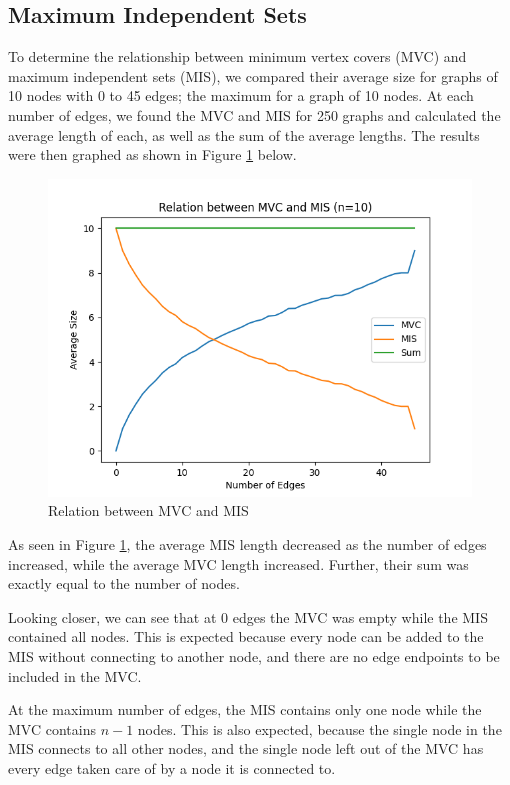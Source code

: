 \documentclass[titlepage]{article}
\begin{document}
\subsection{Maximum Independent Sets}

To determine the relationship between minimum vertex covers (MVC) and maximum independent sets (MIS), we compared their average size for graphs of 10 nodes with 0 to 45 edges; the maximum for a graph of 10 nodes. At each number of edges, we found the MVC and MIS for 250 graphs and calculated the average length of each, as well as the sum of the average lengths. The results were then graphed as shown in Figure \ref{fig:mvc_mis} below.

\begin{figure}[H]
    \centering
    \includegraphics[width=0.8\linewidth]{mvc_mis.png}
    \caption{Relation between MVC and MIS}
    \label{fig:mvc_mis}
\end{figure}

As seen in Figure \ref{fig:mvc_mis}, the average MIS length decreased as the number of edges increased, while the average MVC length increased. Further, their sum was exactly equal to the number of nodes.

Looking closer, we can see that at 0 edges the MVC was empty while the MIS contained all nodes. This is expected because every node can be added to the MIS without connecting to another node, and there are no edge endpoints to be included in the MVC.

At the maximum number of edges, the MIS contains only one node while the MVC contains $n-1$ nodes. This is also expected, because the single node in the MIS connects to all other nodes, and the single node left out of the MVC has every edge taken care of by a node it is connected to.
\end{document}
